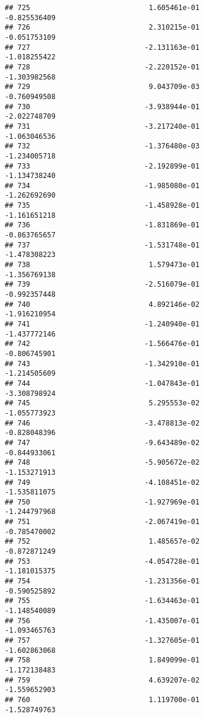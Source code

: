 \documentclass[
]{article}
\begin{document}
\begin{verbatim}
## 725                            1.605461e-01               -0.825536409
## 726                            2.310215e-01               -0.051753109
## 727                           -2.131163e-01               -1.018255422
## 728                           -2.220152e-01               -1.303982568
## 729                            9.043709e-03               -0.760949508
## 730                           -3.938944e-01               -2.022748709
## 731                           -3.217240e-01               -1.063046536
## 732                           -1.376480e-03               -1.234005718
## 733                           -2.192899e-01               -1.134738240
## 734                           -1.985080e-01               -1.262692690
## 735                           -1.458928e-01               -1.161651218
## 736                           -1.831869e-01               -0.863765657
## 737                           -1.531748e-01               -1.478308223
## 738                            1.579473e-01               -1.356769138
## 739                           -2.516079e-01               -0.992357448
## 740                            4.892146e-02               -1.916210954
## 741                           -1.240940e-01               -1.437772146
## 742                           -1.566476e-01               -0.806745901
## 743                           -1.342910e-01               -1.214505609
## 744                           -1.047843e-01               -3.308798924
## 745                            5.295553e-02               -1.055773923
## 746                           -3.478813e-02               -0.828048396
## 747                           -9.643489e-02               -0.844933061
## 748                           -5.905672e-02               -1.153271913
## 749                           -4.108451e-02               -1.535811075
## 750                           -1.927969e-01               -1.244797968
## 751                           -2.067419e-01               -0.785470002
## 752                            1.485657e-02               -0.872871249
## 753                           -4.054728e-01               -1.181015375
## 754                           -1.231356e-01               -0.590525892
## 755                           -1.634463e-01               -1.148540089
## 756                           -1.435007e-01               -1.093465763
## 757                           -1.327605e-01               -1.602863068
## 758                            1.849099e-01               -1.172138483
## 759                            4.639207e-02               -1.559652903
## 760                            1.119700e-01               -1.528749763

\end{verbatim}
\end{document}
